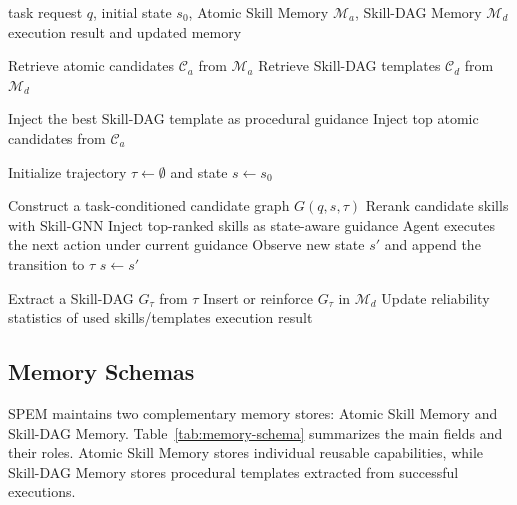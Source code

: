 \documentclass[letterpaper]{article}
\newcommand{\model}{\textsc{SPEM}}
\begin{document}
\begin{algorithm}[h]
\caption{Overall Inference of \model{}}
\label{alg:overall_inference}
\begin{algorithmic}[1]
\REQUIRE task request $q$, initial state $s_0$, Atomic Skill Memory $\mathcal{M}_a$, Skill-DAG Memory $\mathcal{M}_d$
\ENSURE execution result and updated memory

\STATE Retrieve atomic candidates $\mathcal{C}_a$ from $\mathcal{M}_a$
\STATE Retrieve Skill-DAG templates $\mathcal{C}_d$ from $\mathcal{M}_d$

    \STATE Inject the best Skill-DAG template as procedural guidance
\ELSE
    \STATE Inject top atomic candidates from $\mathcal{C}_a$
\ENDIF

\STATE Initialize trajectory $\tau \leftarrow \emptyset$ and state $s \leftarrow s_0$

        \STATE Construct a task-conditioned candidate graph $G(q,s,\tau)$
        \STATE Rerank candidate skills with Skill-GNN
        \STATE Inject top-ranked skills as state-aware guidance
    \ENDIF
    \STATE Agent executes the next action under current guidance
    \STATE Observe new state $s'$ and append the transition to $\tau$
    \STATE $s \leftarrow s'$
\ENDWHILE

    \STATE Extract a Skill-DAG $G_\tau$ from $\tau$
    \STATE Insert or reinforce $G_\tau$ in $\mathcal{M}_d$
\ELSE
    \STATE Update reliability statistics of used skills/templates
\ENDIF
\STATE \RETURN execution result
\end{algorithmic}
\end{algorithm}


\subsection{Memory Schemas}
\label{app:memory_schemas}

\model{} maintains two complementary memory stores: Atomic Skill Memory and
Skill-DAG Memory. Table~\ref{tab:memory-schema} summarizes the main fields and
their roles. Atomic Skill Memory stores individual reusable capabilities, while
Skill-DAG Memory stores procedural templates extracted from successful
executions.
\end{document}

